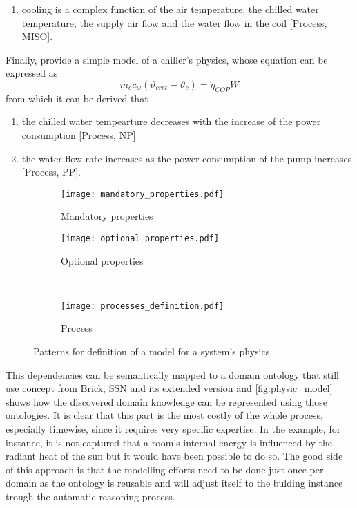 \begin{enumerate}
  \item cooling is a complex function of the air temperature, the chilled water temperature, the supply air flow and the water flow in the coil [Process, MISO].
\end{enumerate}
Finally, \textcite{building_chiller_physics} provide a simple model of a chiller's physics, whose equation can be expressed as
\begin{equation}
  \dot{m_c}c_w(\vartheta_{cret}-\vartheta_c)=\eta_{COP}W
\end{equation}
from which it can be derived that
\begin{enumerate}
  \item the chilled water tempearture decreases with the increase of the power consumption [Process, NP]
  \item the water flow rate increases as the power consumption of the pump increases [Process, PP].
\end{enumerate}
\begin{figure}
  \begin{subfigure}[b]{.6\textwidth}
    \centering
      \texttt{[image: mandatory\_properties.pdf]}
      \caption{Mandatory properties}
      \label{fig:mandatory_properties}
  \end{subfigure}
  \begin{subfigure}[b]{.4\textwidth}
    \centering
      \texttt{[image: optional\_properties.pdf]}
      \caption{Optional properties}
      \label{fig:optional_properties}
  \end{subfigure}
  ~
  \centering
  \begin{subfigure}[b]{.5\textwidth}
    \centering
      \texttt{[image: processes\_definition.pdf]}
      \caption{Process}
      \label{fig:processes_definition}
  \end{subfigure}
  \caption{Patterns for definition of a model for a system's physics}
  \label{fig:physic_model}
\end{figure}
This dependencies can be semantically mapped to a domain ontology that still use concept from Brick, SSN and its extended version and \autoref{fig:physic_model} shows how the discovered domain knowledge can be represented using those ontologies.
It is clear that this part is the most costly of the whole process, especially timewise, since it requires very specific expertise. In the example, for instance, it is not captured that a room's internal energy is influenced by the radiant heat of the sun but it would have been possible to do so. The good side of this approach is that the modelling efforts need to be done just once per domain as the ontology is reusable and will adjust itself to the bulding instance trough the automatic reasoning process.

